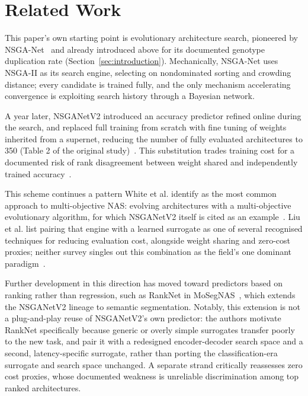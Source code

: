 \section{Related Work}
\label{sec:related-work}

This paper's own starting point is evolutionary architecture search, pioneered by NSGA-Net~\citep{lu2019nsganet} and already introduced above for its documented genotype duplication rate (Section~\ref{sec:introduction}). Mechanically, NSGA-Net uses NSGA-II as its search engine, selecting on nondominated sorting and crowding distance; every candidate is trained fully, and the only mechanism accelerating convergence is exploiting search history through a Bayesian network.

A year later, NSGANetV2 introduced an accuracy predictor refined online during the search, and replaced full training from scratch with fine tuning of weights inherited from a supernet, reducing the number of fully evaluated architectures to 350 (Table 2 of the original study)~\citep{lu2020nsganetv2}. This substitution trades training cost for a documented risk of rank disagreement between weight shared and independently trained accuracy~\citep{yu2020evaluatingnas}.

This scheme continues a pattern White et al. identify as the most common approach to multi-objective NAS: evolving architectures with a multi-objective evolutionary algorithm, for which NSGANetV2 itself is cited as an example~\citep{white2023insights}. Liu et al. list pairing that engine with a learned surrogate as one of several recognised techniques for reducing evaluation cost, alongside weight sharing and zero-cost proxies; neither survey singles out this combination as the field's one dominant paradigm~\citep{liu2023survey}.

Further development in this direction has moved toward predictors based on ranking rather than regression, such as RankNet in MoSegNAS~\citep{lu2022mosegnas}, which extends the NSGANetV2 lineage to semantic segmentation. Notably, this extension is not a plug-and-play reuse of NSGANetV2's own predictor: the authors motivate RankNet specifically because generic or overly simple surrogates transfer poorly to the new task, and pair it with a redesigned encoder-decoder search space and a second, latency-specific surrogate, rather than porting the classification-era surrogate and search space unchanged. A separate strand critically reassesses zero cost proxies, whose documented weakness is unreliable discrimination among top ranked architectures.

